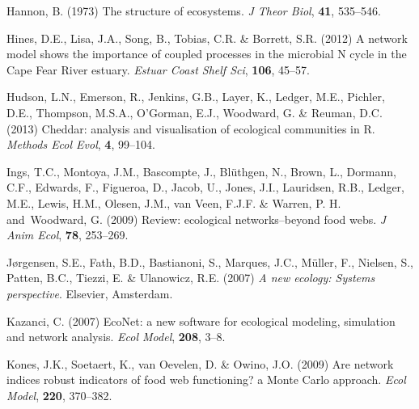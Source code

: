 \documentclass[11pt]{article}
\begin{document}
\begin{thebibliography}{75}
Hannon, B. (1973) The structure of ecosystems.
\newblock \emph{J Theor Biol}, \textbf{41}, 535--546.

Hines, D.E., Lisa, J.A., Song, B., Tobias, C.R. \& Borrett, S.R. (2012) A
  network model shows the importance of coupled processes in the microbial {N}
  cycle in the {Cape Fear River} estuary.
\newblock \emph{Estuar Coast Shelf Sci}, \textbf{106}, 45--57.

Hudson, L.N., Emerson, R., Jenkins, G.B., Layer, K., Ledger, M.E., Pichler,
  D.E., Thompson, M.S.A., O'Gorman, E.J., Woodward, G. \& Reuman, D.C. (2013)
  Cheddar: analysis and visualisation of ecological communities in {R}.
\newblock \emph{Methods Ecol Evol}, \textbf{4}, 99--104.

Ings, T.C., Montoya, J.M., Bascompte, J., Bl{\"u}thgen, N., Brown, L., Dormann,
  C.F., Edwards, F., Figueroa, D., Jacob, U., Jones, J.I., Lauridsen, R.B.,
  Ledger, M.E., Lewis, H.M., Olesen, J.M., van Veen, F.J.F. \& Warren, P. H.
  and~Woodward, G. (2009) Review: ecological networks--beyond food webs.
\newblock \emph{J Anim Ecol}, \textbf{78}, 253--269.

J{\o}rgensen, S.E., Fath, B.D., Bastianoni, S., Marques, J.C., M\"{u}ller, F.,
  Nielsen, S., Patten, B.C., Tiezzi, E. \& Ulanowicz, R.E. (2007) \emph{A new
  ecology: Systems perspective}.
\newblock Elsevier, Amsterdam.

Kazanci, C. (2007) Eco{N}et: a new software for ecological modeling, simulation
  and network analysis.
\newblock \emph{Ecol Model}, \textbf{208}, 3--8.

Kones, J.K., Soetaert, K., van Oevelen, D. \& Owino, J.O. (2009) Are network
  indices robust indicators of food web functioning? a {M}onte {C}arlo
  approach.
\newblock \emph{Ecol Model}, \textbf{220}, 370--382.


\end{thebibliography}
\end{document}
